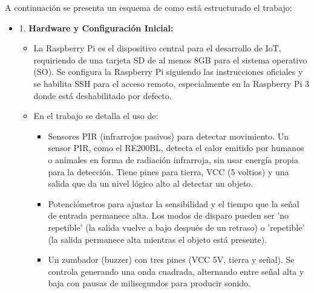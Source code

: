 \documentclass{report}
\begin{document}
A continuación se presenta un esquema de como está estructurado el trabajo:
\begin{itemize}
\item 1. \textbf{Hardware y Configuración Inicial:}
\begin{itemize}
    \item La Raspberry Pi es el dispositivo central para el desarrollo de IoT, requiriendo de una tarjeta SD de al menos 8GB para 
    el sistema operativo (SO). Se configura la Raspberry Pi siguiendo las instrucciones oficiales y se habilita SSH para el 
    acceso remoto, especialmente en la Raspberry Pi 3 donde está deshabilitado por defecto.
    \item En el trabajo se detalla el uso de:
    \begin{itemize}
        \item Sensores PIR (infrarrojos pasivos) para detectar movimiento. Un sensor PIR, como el RE200BL, 
        detecta el calor emitido por humanos o animales en forma de radiación infrarroja, sin usar energía propia para la detección. 
        Tiene pines para tierra, VCC (5 voltios) y una salida que da un nivel lógico alto al detectar un objeto.
        \item Potenciómetros para ajustar la sensibilidad y el tiempo que la señal de entrada permanece alta. 
        Los modos de disparo pueden ser 'no repetible' (la salida vuelve a bajo después de un retraso) o 'repetible' (la salida 
        permanece alta mientras el objeto está presente).
        \item Un zumbador (buzzer) con tres pines (VCC 5V, tierra y señal). Se controla generando 
        una onda cuadrada, alternando entre señal alta y baja con pausas de milisegundos para producir sonido.
    \end{itemize}
\end{itemize}


\end{itemize}
\end{document}
